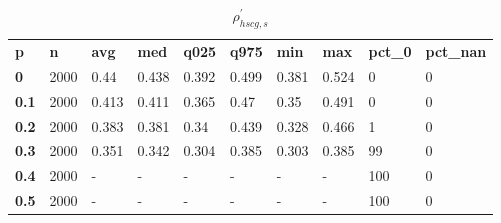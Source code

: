 \begin{table}[h]
 \centering 
\footnotesize
\caption{$\rho_{hscg,s}^\prime $}
\label{tab:alphahscgs}
\begin{tabular}[h]{| l l l l l l l l l l|
    } \hline
\textbf{ p} & \textbf{ n} & \textbf{ avg} & \textbf{ med} & \textbf{ q025} & \textbf{ q975} & \textbf{ min} & \textbf{ max} & \textbf{ pct\_0} & \textbf{ pct\_nan}
           \\
  \textbf{  0} & 2000 &  0.44 & 0.438 & 0.392 & 0.499 & 0.381 & 0.524 &   0 & 0
           \\
  \textbf{0.1} & 2000 & 0.413 & 0.411 & 0.365 &  0.47 &  0.35 & 0.491 &   0 & 0
           \\
  \textbf{0.2} & 2000 & 0.383 & 0.381 &  0.34 & 0.439 & 0.328 & 0.466 &   1 & 0
           \\
  \textbf{0.3} & 2000 & 0.351 & 0.342 & 0.304 & 0.385 & 0.303 & 0.385 &  99 & 0
           \\
  \textbf{0.4} & 2000 & - & - & - & - & - & - & 100 & 0
           \\
  \textbf{0.5} & 2000 & - & - & - & - & - & - & 100 & 0
           \\
 \hline \end{tabular}
 \end{table}
